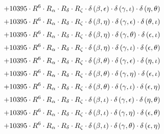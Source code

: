 \begin{subequations}
\begin{gather}
 \\[0.2em] \notag 		 + 10395 \cdot R^{6} \cdot R_{\alpha{}} \cdot R_{\delta{}} \cdot R_{\zeta{}} \cdot \delta{}\left(\beta{}, \epsilon{}\right) \cdot \delta{}\left(\gamma{}, \iota{}\right) \cdot \delta{}\left(\eta{}, \theta{}\right) 
 \\[0.2em] \notag 		 + 10395 \cdot R^{6} \cdot R_{\alpha{}} \cdot R_{\delta{}} \cdot R_{\zeta{}} \cdot \delta{}\left(\beta{}, \eta{}\right) \cdot \delta{}\left(\gamma{}, \epsilon{}\right) \cdot \delta{}\left(\theta{}, \iota{}\right) 
 \\[0.2em] \notag 		 + 10395 \cdot R^{6} \cdot R_{\alpha{}} \cdot R_{\delta{}} \cdot R_{\zeta{}} \cdot \delta{}\left(\beta{}, \eta{}\right) \cdot \delta{}\left(\gamma{}, \theta{}\right) \cdot \delta{}\left(\epsilon{}, \iota{}\right) 
 \\[0.2em] \notag 		 + 10395 \cdot R^{6} \cdot R_{\alpha{}} \cdot R_{\delta{}} \cdot R_{\zeta{}} \cdot \delta{}\left(\beta{}, \eta{}\right) \cdot \delta{}\left(\gamma{}, \iota{}\right) \cdot \delta{}\left(\epsilon{}, \theta{}\right) 
 \\[0.2em] \notag 		 + 10395 \cdot R^{6} \cdot R_{\alpha{}} \cdot R_{\delta{}} \cdot R_{\zeta{}} \cdot \delta{}\left(\beta{}, \theta{}\right) \cdot \delta{}\left(\gamma{}, \epsilon{}\right) \cdot \delta{}\left(\eta{}, \iota{}\right) 
 \\[0.2em] \notag 		 + 10395 \cdot R^{6} \cdot R_{\alpha{}} \cdot R_{\delta{}} \cdot R_{\zeta{}} \cdot \delta{}\left(\beta{}, \theta{}\right) \cdot \delta{}\left(\gamma{}, \eta{}\right) \cdot \delta{}\left(\epsilon{}, \iota{}\right) 
 \\[0.2em] \notag 		 + 10395 \cdot R^{6} \cdot R_{\alpha{}} \cdot R_{\delta{}} \cdot R_{\zeta{}} \cdot \delta{}\left(\beta{}, \theta{}\right) \cdot \delta{}\left(\gamma{}, \iota{}\right) \cdot \delta{}\left(\epsilon{}, \eta{}\right) 
 \\[0.2em] \notag 		 + 10395 \cdot R^{6} \cdot R_{\alpha{}} \cdot R_{\delta{}} \cdot R_{\zeta{}} \cdot \delta{}\left(\beta{}, \iota{}\right) \cdot \delta{}\left(\gamma{}, \epsilon{}\right) \cdot \delta{}\left(\eta{}, \theta{}\right) 
 \\[0.2em] \notag 		 + 10395 \cdot R^{6} \cdot R_{\alpha{}} \cdot R_{\delta{}} \cdot R_{\zeta{}} \cdot \delta{}\left(\beta{}, \iota{}\right) \cdot \delta{}\left(\gamma{}, \eta{}\right) \cdot \delta{}\left(\epsilon{}, \theta{}\right) 
 \\[0.2em] \notag 		 + 10395 \cdot R^{6} \cdot R_{\alpha{}} \cdot R_{\delta{}} \cdot R_{\zeta{}} \cdot \delta{}\left(\beta{}, \iota{}\right) \cdot \delta{}\left(\gamma{}, \theta{}\right) \cdot \delta{}\left(\epsilon{}, \eta{}\right) 

\end{gather}
\end{subequations}
